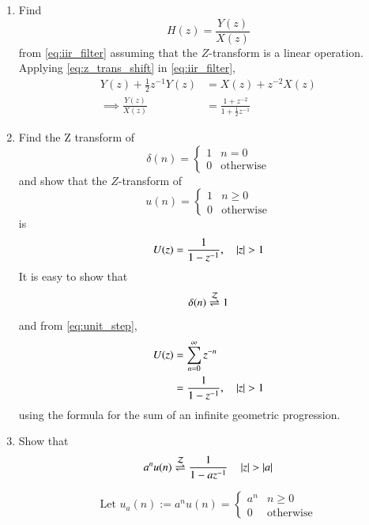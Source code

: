 \documentclass[journal,12pt,twocolumn]{IEEEtran}
\renewcommand\thesection{\arabic{section}}
\begin{document}
\begin{enumerate}[label=\thesection.\arabic*]
\item Find
%
\begin{equation}
H(z) = \frac{Y(z)}{X(z)}
\end{equation}
%
from  \eqref{eq:iir_filter} assuming that the $Z$-transform is a linear operation.
\\
\solution  Applying \eqref{eq:z_trans_shift} in \eqref{eq:iir_filter},
\begin{align}
Y(z) + \frac{1}{2}z^{-1}Y(z) &= X(z)+z^{-2}X(z)
\\
\implies \frac{Y(z)}{X(z)} &= \frac{1 + z^{-2}}{1 + \frac{1}{2}z^{-1}}
\label{eq:freq_resp}
\end{align}
%
\item Find the Z transform of 
\begin{equation}
\delta(n)
=
\begin{cases}
1 & n = 0
\\
0 & \text{otherwise}
\end{cases}
\end{equation}
and show that the $Z$-transform of
\begin{equation}
\label{eq:unit_step}
u(n)
=
\begin{cases}
1 & n \ge 0
\\
0 & \text{otherwise}
\end{cases}
\end{equation}
is
\begin{equation}
U(z) = \frac{1}{1-z^{-1}}, \quad \left \vert z\right\vert > 1
\end{equation}
\solution It is easy to show that
\begin{equation}
\delta(n) \overset{\mathcal{Z}}{ \rightleftharpoons} 1
\end{equation}
and from \eqref{eq:unit_step},
\begin{align}
\label{eq:4.14}
U(z) &= \sum _{n= 0}^{\infty}z^{-n}
\\
&=\frac{1}{1-z^{-1}}, \quad \left \vert z\right\vert > 1
\end{align}
using the formula for the sum of an infinite geometric progression.
%
\item Show that 
\begin{equation}
\label{eq:anun}
a^nu(n) \overset{\mathcal{Z}}{ \rightleftharpoons} \frac{1}{1-az^{-1}} \quad \left \vert z\right\vert > \left \vert a\right\vert
\end{equation}
%

\solution 
\begin{equation}
\text{Let } u_a(n) := a^nu(n) =
\begin{cases}
a^n & n \ge 0
\\
0 & \text{otherwise}
\end{cases}
\end{equation}


\end{enumerate}
\end{document}
